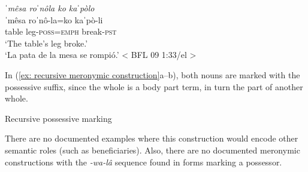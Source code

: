     {\textit{ˈmêsa   roˈnôla  ko  kaˈpòlo}}\\
    \gll    ˈmêsa  roˈnô-la=ko  kaˈpò-li\\
            table  leg-\textsc{poss}=\textsc{emph} break-\textsc{pst}  \\
    \glt    ‘The table’s leg broke.’\\
    \glt    ‘La pata de la mesa se rompió.’ < BFL 09 1:33/el >  \\

\z

In (\ref{ex: recursive meronymic construction}a--b), both nouns are marked with the possessive suffix, since the whole is a body part term, in turn the part of another whole.

\ea\label{ex: recursive meronymic construction}
{Recursive possessive marking}\\


    \z
\z

There are no documented examples where this construction would encode other semantic roles (such as beneficiaries). Also, there are no documented meronymic constructions with the \textit{-wa-lâ} sequence found in forms marking a possessor.

